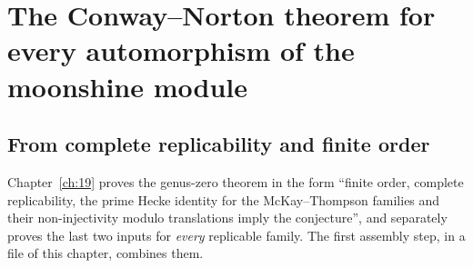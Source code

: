 \section[The Conway--Norton theorem for every automorphism]{The Conway--Norton theorem for every automorphism of the moonshine module}\label{ch20:sec:assembly}

\subsection{From complete replicability and finite order}

Chapter~\ref{ch:19} proves the genus-zero theorem in the form ``finite order, complete replicability, the prime Hecke
identity for the McKay--Thompson families and their non-injectivity modulo translations imply the conjecture'', and
separately proves the last two inputs for \emph{every} replicable family.  The first assembly step, in a file of this
chapter, combines them.

